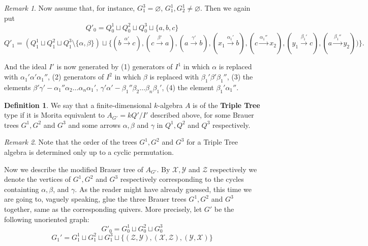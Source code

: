 \documentclass[12pt]{amsart}
\theoremstyle{plain}
\theoremstyle{remark}
\newtheorem*{remark}{Remark}
\theoremstyle{definition}
\newtheorem{definition}{Definition}[section]
\begin{document}
\begin{remark} Now assume that, for instance, $G^3_1 = \varnothing$, $G_1^1, G_2^1 \neq \varnothing$. Then we again put $$Q'_0 = Q^1_0 \sqcup Q^2_0 \sqcup Q^3_0 \sqcup \{a, b, c\}$$ $$Q'_1 =( Q^1_1 \sqcup Q^2_1 \sqcup Q^3_1  \setminus \{\alpha, \beta\}) \sqcup \{ (b \xrightarrow{\alpha'} c), (c \xrightarrow{\beta'} a), (a \xrightarrow{\gamma'} b), (x_1 \xrightarrow{\alpha_1'} b), (c \xrightarrow{\alpha_1''} x_2), (y_1\xrightarrow{\beta_1'} c), (a \xrightarrow{\beta_1''} y_2))  \}.$$ 

And the ideal $I'$ is now generated by (1) generators of $I^1$ in which $\alpha$ is replaced with $\alpha_1' \alpha' \alpha_1''$, (2) generators of $I^2$ in which $\beta$ is replaced with $\beta_1' \beta' \beta_1''$, (3) the elements $\beta'\gamma' - \alpha_1''\alpha_2 \dots \alpha_n \alpha_1'$, $\gamma'\alpha' - \beta_1''\beta_2\dots \beta_n \beta_1'$, (4) the element  $\beta_1'\alpha_1''$.  \end{remark}



\begin{definition} We say that a finite-dimensional $k$-algebra $A$ is of the {\bf Triple Tree} type if it is Morita equivalent to $A_{G'} = kQ'/I'$ described above, for some Brauer trees $G^1, G^2$ and $G^3$ and some arrows $\alpha, \beta$ and $\gamma$ in $Q^1, Q^2$ and $Q^3$ respectively.  \end{definition}

\begin{remark} Note that the order of the trees $G^1,G^2$ and $G^3$ for a Triple Tree algebra is determined only up to a cyclic permutation.  \end{remark}

Now we describe the modified Brauer tree of $A_{G'}$. By $\mathscr{X}, \mathscr{Y}$ and $\mathscr{Z}$ respectively we denote the vertices of $G^1, G^2$ and $G^3$ respectively corresponding to the cycles containting $\alpha, \beta$, and $\gamma$. As the reader might have already guessed, this time we are going to, vaguely speaking, glue the three Brauer trees $G^1, G^2$ and $G^3$ together, same as the corresponding quivers. More precisely, let $G'$ be the following unoriented graph: 
$$G'_0 = G^1_0 \sqcup G^2_0 \sqcup G^3_0$$
$$G_1' = G^1_1 \sqcup G^2_1 \sqcup G^3_1 \sqcup \{(\mathscr{Z}, \mathscr{Y}), (\mathscr{X}, \mathscr{Z}), (\mathscr{Y}, \mathscr{X})\}$$
\end{document}
